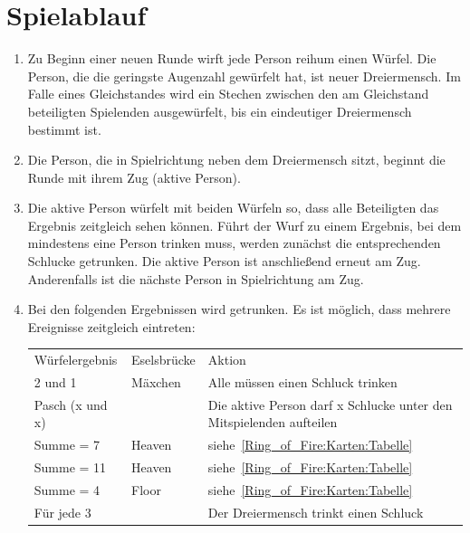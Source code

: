 \section{Spielablauf}
\begin{enumerate}[label={(\arabic*)}]
	\item\label{Dreiermensch:Spielablauf:NeueRunde}
	Zu Beginn einer neuen Runde wirft jede Person reihum einen Würfel.
	Die Person, die die geringste Augenzahl gewürfelt hat, ist neuer Dreiermensch.
	Im Falle eines Gleichstandes wird ein Stechen zwischen den am Gleichstand beteiligten Spielenden ausgewürfelt, bis ein eindeutiger Dreiermensch bestimmt ist.
	
	\item
	Die Person, die in Spielrichtung neben dem Dreiermensch sitzt, beginnt die Runde mit ihrem Zug (\glqq{}aktive Person\grqq{}).
	
	\item
	Die aktive Person würfelt mit beiden Würfeln so, dass alle Beteiligten das Ergebnis zeitgleich sehen können.
	Führt der Wurf zu einem Ergebnis, bei dem mindestens eine Person trinken muss, werden zunächst die entsprechenden Schlucke getrunken.
	Die aktive Person ist anschließend erneut am Zug.
	Anderenfalls ist die nächste Person in Spielrichtung am Zug.
	
	\item
	Bei den folgenden Ergebnissen wird getrunken. 
	Es ist möglich, dass mehrere Ereignisse zeitgleich eintreten:
	
	\begin{tabulary}{0.92\textwidth}{llL}
		\toprule
		Würfelergebnis   & Eselsbrücke & Aktion \\
		2 und 1          & Mäxchen & Alle müssen einen Schluck trinken \\
		Pasch (x und x)  &         & Die aktive Person darf x Schlucke unter den Mitspielenden aufteilen \\
		Summe = 7        & Heaven  & siehe~\ref{Ring_of_Fire:Karten:Tabelle} \\
		Summe = 11       & Heaven  & siehe~\ref{Ring_of_Fire:Karten:Tabelle} \\
		Summe = 4        & Floor   & siehe~\ref{Ring_of_Fire:Karten:Tabelle} \\
		Für jede 3 &         &Der Dreiermensch trinkt einen Schluck \\\bottomrule
	\end{tabulary}\\


\end{enumerate}

